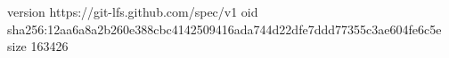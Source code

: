 version https://git-lfs.github.com/spec/v1
oid sha256:12aa6a8a2b260e388cbc4142509416ada744d22dfe7ddd77355c3ae604fe6c5e
size 163426
